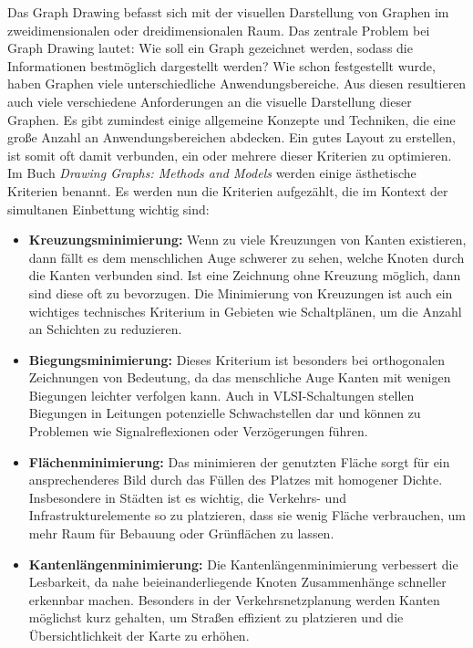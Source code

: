 \documentclass[bachelor, german]{algothesis}
\begin{document}
Das Graph Drawing befasst sich mit der visuellen Darstellung von Graphen im zweidimensionalen oder dreidimensionalen Raum. Das zentrale Problem bei Graph Drawing lautet: Wie soll ein Graph gezeichnet werden, sodass die Informationen bestmöglich dargestellt werden? Wie schon festgestellt wurde, haben Graphen viele unterschiedliche Anwendungsbereiche. Aus diesen resultieren auch viele verschiedene Anforderungen an die visuelle Darstellung dieser Graphen.\newline
Es gibt zumindest einige allgemeine Konzepte und Techniken, die eine große Anzahl an Anwendungsbereichen abdecken. Ein gutes Layout zu erstellen, ist somit oft damit verbunden, ein oder mehrere dieser Kriterien zu optimieren. Im Buch \textit{Drawing Graphs: Methods and Models} \cite{DrawingMeth} werden einige ästhetische Kriterien benannt. Es werden nun die Kriterien aufgezählt, die im Kontext der simultanen Einbettung wichtig sind: 
\begin{itemize}
    \item  \textbf{Kreuzungsminimierung:} Wenn zu viele Kreuzungen von Kanten existieren, dann fällt es dem menschlichen Auge schwerer zu sehen, welche Knoten durch die Kanten verbunden sind. Ist eine Zeichnung ohne Kreuzung möglich, dann sind diese oft zu bevorzugen. Die Minimierung von Kreuzungen ist auch ein wichtiges technisches Kriterium in Gebieten wie Schaltplänen, um die Anzahl an Schichten zu reduzieren.
    \item  \textbf{Biegungsminimierung:} Dieses Kriterium ist besonders bei orthogonalen Zeichnungen von Bedeutung, da das menschliche Auge Kanten mit wenigen Biegungen leichter verfolgen kann. Auch in VLSI-Schaltungen stellen Biegungen in Leitungen potenzielle Schwachstellen dar und können zu Problemen wie Signalreflexionen oder Verzögerungen führen.
    \item  \textbf{Flächenminimierung:} Das minimieren der genutzten Fläche sorgt für ein ansprechenderes Bild durch das Füllen des Platzes mit homogener Dichte. Insbesondere in Städten ist es wichtig, die Verkehrs- und Infrastrukturelemente so zu platzieren, dass sie wenig Fläche verbrauchen, um mehr Raum für Bebauung oder Grünflächen zu lassen.
    \item  \textbf{Kantenlängenminimierung:} Die Kantenlängenminimierung verbessert die Lesbarkeit, da nahe beieinanderliegende Knoten Zusammenhänge schneller erkennbar machen. Besonders in der Verkehrsnetzplanung werden Kanten möglichst kurz gehalten, um Straßen effizient zu platzieren und die Übersichtlichkeit der Karte zu erhöhen.
\end{itemize}
\end{document}
